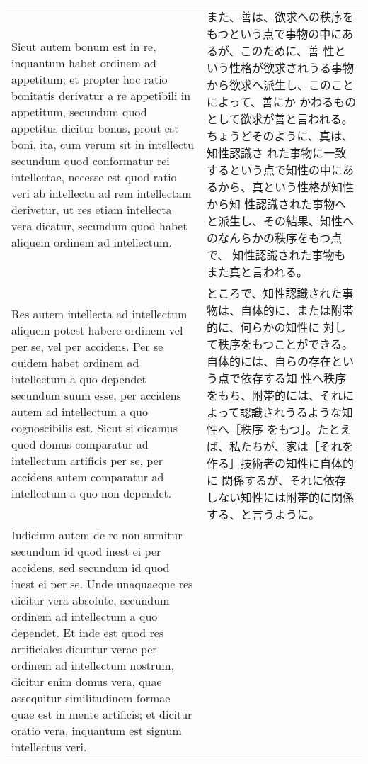 \documentclass[10pt]{jsarticle} %
\begin{document}
\begin{longtable}{p{21em}p{21em}}
\\


\hspace{1em}Sicut autem bonum est in re, inquantum habet ordinem ad
appetitum; et propter hoc ratio bonitatis derivatur a re appetibili in
appetitum, secundum quod appetitus dicitur bonus, prout est boni, ita,
cum verum sit in intellectu secundum quod conformatur rei intellectae,
necesse est quod ratio veri ab intellectu ad rem intellectam derivetur,
ut res etiam intellecta vera dicatur, secundum quod habet aliquem
ordinem ad intellectum. 


&

また、善は、欲求への秩序をもつという点で事物の中にあるが、このために、善
 性という性格が欲求されうる事物から欲求へ派生し、このことによって、善にか
 かわるものとして欲求が善と言われる。ちょうどそのように、真は、知性認識さ
 れた事物に一致するという点で知性の中にあるから、真という性格が知性から知
 性認識された事物へと派生し、その結果、知性へのなんらかの秩序をもつ点で、
 知性認識された事物もまた真と言われる。

 

\\

\hspace{1em}Res autem intellecta ad intellectum aliquem
potest habere ordinem vel per se, vel per accidens. Per se quidem habet
ordinem ad intellectum a quo dependet secundum suum esse, per accidens
autem ad intellectum a quo cognoscibilis est. Sicut si dicamus quod
domus comparatur ad intellectum artificis per se, per accidens autem
comparatur ad intellectum a quo non dependet. 


&

ところで、知性認識された事物は、自体的に、または附帯的に、何らかの知性に
対して秩序をもつことができる。自体的には、自らの存在という点で依存する知
 性へ秩序をもち、附帯的には、それによって認識されうるような知性へ［秩序
 をもつ］。たとえば、私たちが、家は［それを作る］技術者の知性に自体的に
 関係するが、それに依存しない知性には附帯的に関係する、と言うように。


\\


Iudicium autem de re non
sumitur secundum id quod inest ei per accidens, sed secundum id quod
inest ei per se. Unde unaquaeque res dicitur vera absolute, secundum
ordinem ad intellectum a quo dependet. Et inde est quod res artificiales
dicuntur verae per ordinem ad intellectum nostrum, dicitur enim domus
vera, quae assequitur similitudinem formae quae est in mente artificis;
et dicitur oratio vera, inquantum est signum intellectus veri. 


\end{longtable}
\end{document}

